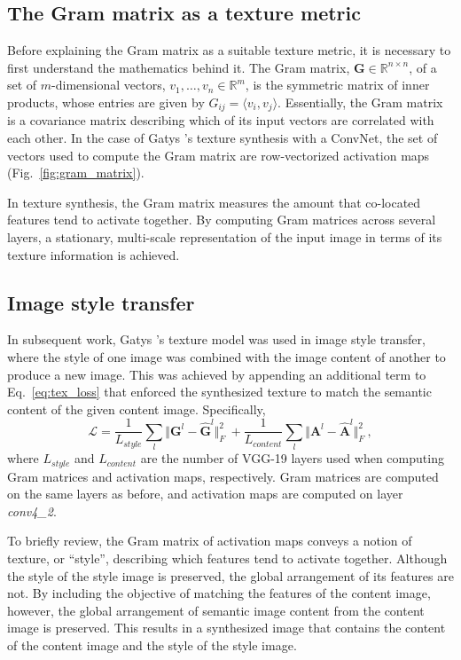 \subsection{The Gram matrix as a texture metric}

Before explaining the Gram matrix as a suitable texture metric, it is necessary to first understand the mathematics behind it. The Gram matrix, $\mathbf{G} \in \mathbb{R}^{n \times n}$, of a set of $m$-dimensional vectors, $v_1, \dots , v_n \in \mathbb{R}^m$, is the symmetric matrix of inner products, whose entries are given by $G_{ij} = \langle v_i, v_j \rangle$. Essentially, the Gram matrix is a covariance matrix describing which of its input vectors are correlated with each other. In the case of Gatys \etal's \cite{gatys2015} texture synthesis with a ConvNet, the set of vectors used to compute the Gram matrix are row-vectorized activation maps (Fig.\ \ref{fig:gram_matrix}).


In texture synthesis, the Gram matrix measures the amount that co-located features tend to activate together. By computing Gram matrices across several layers, a stationary, multi-scale representation of the input image in terms of its texture information is achieved.

\subsection{Image style transfer}

In subsequent work, Gatys \etal's \cite{gatys2016image} texture model was used in image style
transfer, where the style of one image was
combined with the image content of another to produce a new image.
This was achieved by appending an additional term to Eq.\ \ref{eq:tex_loss}
that enforced the synthesized texture to match the semantic content of the given content image. Specifically,
\begin{equation}
   \mathcal{L} = \frac{1}{L_{style}} \sum_{l} \Vert \mathbf{G}^l - \hat{\mathbf{G}}^l \Vert^2_F\ + \frac{1}{L_{content}} \sum_{l} \Vert \mathbf{A}^l - \hat{\mathbf{A}}^l \Vert^2_F\ ,
   \label{eq:styletransfer_loss}
\end{equation}
where $L_{style}$ and $L_{content}$ are the number of VGG-19 layers used when computing Gram matrices and activation maps, respectively. Gram matrices are computed on the same layers as before, and activation maps are computed on layer \emph{conv4\_2}.

To briefly review, the Gram matrix of activation maps conveys a notion of texture, or ``style'', describing which features tend to activate together. Although the style of the style image is preserved, the global arrangement of its features are not. By including the objective of matching the features of the content image, however, the global arrangement of semantic image content from the content image is preserved. This results in a synthesized image that contains the content of the content image and the style of the style image.

